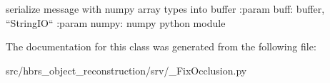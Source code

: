 \begin{DoxyVerb}
serialize message with numpy array types into buffer
:param buff: buffer, ``StringIO``
:param numpy: numpy python module
\end{DoxyVerb}
 

\-The documentation for this class was generated from the following file\-:\begin{DoxyCompactItemize}
\item 
src/hbrs\-\_\-object\-\_\-reconstruction/srv/\-\_\-\-Fix\-Occlusion.\-py\end{DoxyCompactItemize}
